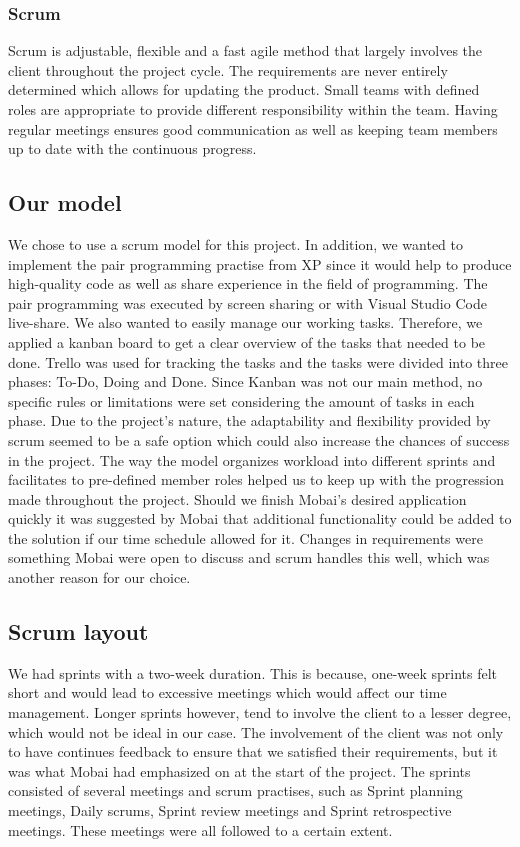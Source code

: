\subsubsection*{Scrum}
Scrum is adjustable, flexible and a fast agile method that largely involves the client throughout the project cycle\cite{ScrumDefinition}. The requirements are never entirely determined which allows for updating the product. Small teams with defined roles are appropriate to provide different responsibility within the team. Having regular meetings ensures good communication as well as keeping team members up to date with the continuous progress.    

\subsection{Our model}
\label{sec:OurModel}
We chose to use a scrum model for this project. In addition, we wanted to implement the pair programming practise from XP since it would help to produce high-quality code as well as share experience in the field of programming. The pair programming was executed by screen sharing or with Visual Studio Code live-share. We also wanted to easily manage our working tasks. Therefore, we applied a kanban board to get a clear overview of the tasks that needed to be done. Trello \cite{Trello} was used for tracking the tasks and the tasks were divided into three phases: To-Do, Doing and Done. Since Kanban was not our main method, no specific rules or limitations were set considering the amount of tasks in each phase. Due to the project's nature, the adaptability and flexibility provided by scrum seemed to be a safe option which could also increase the chances of success in the project. The way the model organizes workload into different sprints and facilitates to pre-defined member roles helped us to keep up with the progression made throughout the project. Should we finish Mobai's desired application quickly it was suggested by Mobai that additional functionality could be added to the solution if our time schedule allowed for it. Changes in requirements were something Mobai were open to discuss and scrum handles this well, which was another reason for our choice. 

\subsection{Scrum layout}
We had sprints with a two-week duration. This is because, one-week sprints felt short and would lead to excessive meetings which would affect our time management. Longer sprints however, tend to involve the client to a lesser degree, which would not be ideal in our case. The involvement of the client was not only to have continues feedback to ensure that we satisfied their requirements, but it was what Mobai had emphasized on at the start of the project. The sprints consisted of several meetings and scrum practises, such as Sprint planning meetings, Daily scrums, Sprint review meetings and Sprint retrospective meetings. These meetings were all followed to a certain extent. 

